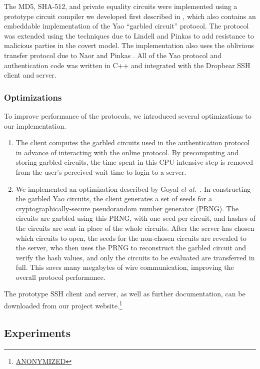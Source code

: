 The MD5, SHA-512, and private equality circuits were implemented using a
prototype circuit compiler we developed first described in
\cite{kruger07}, which also contains an embeddable implementation of
the Yao {}``garbled circuit'' protocol. The protocol was extended
using the techniques due to Lindell and Pinkas
\cite{lindellpinkas-eurocrypt07} to add resistance to malicious
parties in the covert model. The implementation also uses the
oblivious transfer protocol due to Naor and Pinkas
\cite{Naor-Pinkas:2001}.  All of the Yao protocol and authentication
code was written in C++ and integrated with the Dropbear SSH
client and server.

\subsubsection{Optimizations}

To improve performance of the protocols, we introduced several
optimizations to our implementation.
\begin{enumerate}
\item The client computes the garbled circuits used in the
authentication protocol in advance of interacting with the online
protocol.  By precomputing and storing garbled circuits, the time
spent in this CPU intensive step is removed from the user's perceived
wait time to login to a server.
\item We implemented an optimization described by 
Goyal \textit{et al.}~\cite{goyalmohasselsmith-eurocrypt08}.  In
constructing the garbled Yao circuits, the client generates a set of
seeds for a cryptographically-secure pseudorandom number generator (PRNG).
The circuits are garbled using this PRNG, with one seed per circuit,
and hashes of the circuits are sent in place of the whole circuits.
After the server has chosen which circuits to open, the seeds for
the non-chosen circuits are revealed to the server, who then uses the
PRNG to reconstruct the garbled circuit and verify the hash values,
and only the circuits to be evaluated are transferred in full.  This
saves many megabytes of wire communication, improving the overall
protocol performance.
\end{enumerate}

The prototype SSH client and server, as well as further documentation,
can be downloaded from our project 
website.\footnote{\url{ANONYMIZED}}


\subsection{Experiments}

